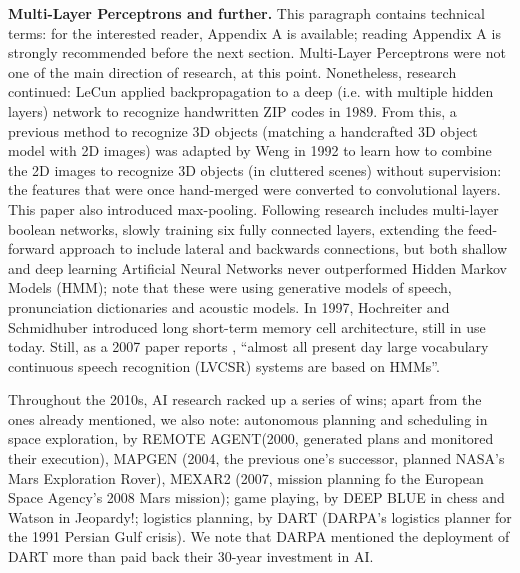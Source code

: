 \documentclass[../main.tex]{subfiles}
\begin{document}
\vspace{4pt}
\textbf{Multi-Layer Perceptrons and further.} This paragraph contains technical terms: for the interested reader, Appendix A is available; reading Appendix A is strongly recommended before the next section. Multi-Layer Perceptrons were not one of the main direction of research, at this point. Nonetheless, research continued: LeCun applied backpropagation to a deep (i.e. with multiple hidden layers) network to recognize handwritten ZIP codes in 1989\cite{lecunBackpropagationAppliedHandwritten1989}. From this, a previous method to recognize 3D objects (matching a handcrafted 3D object model with 2D images) was adapted by Weng in 1992\cite{wengCresceptronSelforganizingNeural1992} to learn how to combine the 2D images to recognize 3D objects (in cluttered scenes) without supervision: the features that were once hand-merged were converted to convolutional layers. This paper also introduced max-pooling. Following research includes multi-layer boolean networks\cite{decarvalhoIntegratedBooleanNeural1994}, slowly training six fully connected layers\cite{hintonWakesleepAlgorithmUnsupervised1995}, extending the feed-forward approach to include lateral and backwards connections\cite{behnkeNeuralAbstractionPyramid2003}, but both shallow and deep learning Artificial Neural Networks never outperformed Hidden Markov Models (HMM); note that these were using generative models of speech, pronunciation dictionaries and acoustic models. 
In 1997, Hochreiter and Schmidhuber introduced long short-term memory cell architecture\cite{hochreiterLongShortTermMemory1997}, still in use today. Still, as a 2007 paper reports \cite{galesApplicationHiddenMarkov2007}, \enquote{almost all present day large vocabulary continuous speech recognition (LVCSR) systems are based on HMMs}.

\vspace{4pt}
Throughout the 2010s, AI research racked up a series of wins; apart from the ones already mentioned, we also note: autonomous planning and scheduling in space exploration, by REMOTE AGENT(2000, generated plans and monitored their execution), MAPGEN (2004, the previous one's successor, planned NASA's Mars Exploration Rover), MEXAR2 (2007, mission planning fo the European Space Agency's 2008 Mars mission); game playing, by DEEP BLUE in chess and Watson in Jeopardy!; logistics planning, by DART (DARPA's logistics planner for the 1991 Persian Gulf crisis). We note that DARPA mentioned the deployment of DART more than paid back their 30-year investment in AI.
\end{document}
